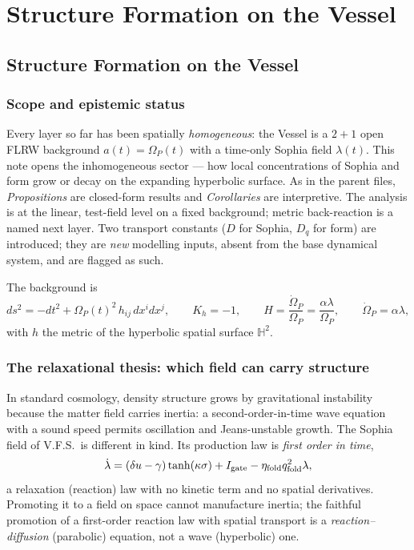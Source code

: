 \documentclass[11pt,a4paper,oneside]{book}
\newcommand{\Op}{\Omega_P}
\newcommand{\Igate}{I_{\rm gate}}
\newcommand{\qf}{q_{\rm fold}}
\newcommand{\Hh}{\mathbb{H}^2}
\theoremstyle{plain}
\theoremstyle{definition}
\theoremstyle{remark}
\begin{document}
\part{Structure Formation on the Vessel}

\chapter{Structure Formation on the Vessel}

\section*{Scope and epistemic status}
Every layer so far has been spatially \emph{homogeneous}: the Vessel is a $2{+}1$ open FLRW background
$a(t)=\Op(t)$ with a time-only Sophia field $\lambda(t)$. This note opens the inhomogeneous sector ---
how local concentrations of Sophia and form grow or decay on the expanding hyperbolic surface. As in the
parent files, \emph{Propositions} are closed-form results and \emph{Corollaries} are interpretive. The
analysis is at the linear, test-field level on a fixed background; metric back-reaction is a named next
layer. Two transport constants ($D$ for Sophia, $D_q$ for form) are introduced; they are \emph{new}
modelling inputs, absent from the base dynamical system, and are flagged as such.

The background is
\begin{equation}
ds^2=-dt^2+\Op(t)^2\,h_{ij}\,dx^i dx^j,\qquad
K_h=-1,\qquad
H=\frac{\dot\Op}{\Op}=\frac{\alpha\lambda}{\Op},\qquad
\dot\Op=\alpha\lambda,
\end{equation}
with $h$ the metric of the hyperbolic spatial surface $\Hh$.

\section{The relaxational thesis: which field can carry structure}

In standard cosmology, density structure grows by gravitational instability because the matter field
carries inertia: a second-order-in-time wave equation with a sound speed permits oscillation and
Jeans-unstable growth. The Sophia field of V.F.S.\ is different in kind. Its production law is
\emph{first order in time},
\begin{equation}
\dot\lambda=(\delta u-\gamma)\tanh(\kappa\sigma)+\Igate-\eta_{\rm fold}\qf^2\lambda,
\end{equation}
a relaxation (reaction) law with no kinetic term and no spatial derivatives. Promoting it to a field on
space cannot manufacture inertia; the faithful promotion of a first-order reaction law with spatial
transport is a \emph{reaction--diffusion} (parabolic) equation, not a wave (hyperbolic) one.
\end{document}

